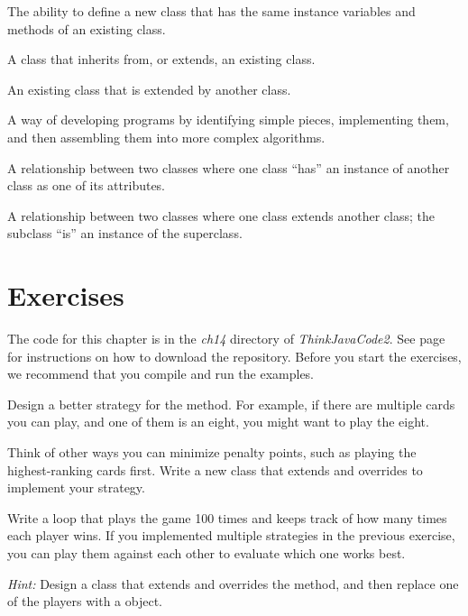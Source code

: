 \begin{description}

The ability to define a new class that has the same instance variables and methods of an existing class.

A class that inherits from, or extends, an existing class.

An existing class that is extended by another class.


A way of developing programs by identifying simple pieces, implementing them, and then assembling them into more complex algorithms.

A relationship between two classes where one class ``has'' an instance of another class as one of its attributes.

A relationship between two classes where one class extends another class; the subclass ``is'' an instance of the superclass.

\end{description}


\section{Exercises}

The code for this chapter is in the {\it ch14} directory of {\it ThinkJavaCode2}.
See page~\pageref{code} for instructions on how to download the repository.
Before you start the exercises, we recommend that you compile and run the examples.


\begin{exercise}  %

Design a better strategy for the  method.
For example, if there are multiple cards you can play, and one of them is an eight, you might want to play the eight.


Think of other ways you can minimize penalty points, such as playing the highest-ranking cards first.
Write a new class that extends  and overrides  to implement your strategy.

\end{exercise}


\begin{exercise}  %

Write a loop that plays the game 100 times and keeps track of how many times each player wins.
If you implemented multiple strategies in the previous exercise, you can play them against each other to evaluate which one works best.

{\em Hint:} Design a  class that extends  and overrides the  method, and then replace one of the players with a  object.

\end{exercise}


